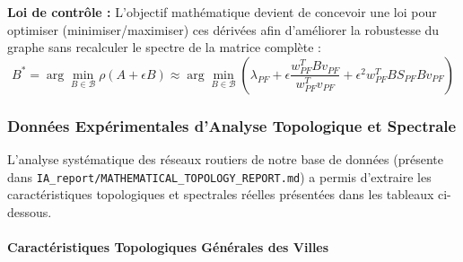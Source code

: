 \documentclass[10pt, a4paper]{article}
\begin{document}
\textbf{Loi de contrôle :} L'objectif mathématique devient de concevoir
une loi pour optimiser (minimiser/maximiser) ces dérivées afin
d'améliorer la robustesse du graphe sans recalculer le spectre de la
matrice complète :
\[B^* = \arg\min_{B \in \mathcal{B}} \rho(A + \epsilon B) \approx \arg\min_{B \in \mathcal{B}} \left( \lambda_{PF} + \epsilon \frac{w_{PF}^T B v_{PF}}{w_{PF}^T v_{PF}} + \epsilon^2 w_{PF}^T B S_{PF} B v_{PF} \right)\]

\subsubsection{Données Expérimentales d'Analyse Topologique et
Spectrale}\label{donnuxe9es-expuxe9rimentales-danalyse-topologique-et-spectrale}

L'analyse systématique des réseaux routiers de notre base de données
(présente dans \texttt{IA\_report/MATHEMATICAL\_TOPOLOGY\_REPORT.md}) a
permis d'extraire les caractéristiques topologiques et spectrales
réelles présentées dans les tableaux ci-dessous.

\paragraph{Caractéristiques Topologiques Générales des
Villes}\label{caractuxe9ristiques-topologiques-guxe9nuxe9rales-des-villes}
\end{document}
